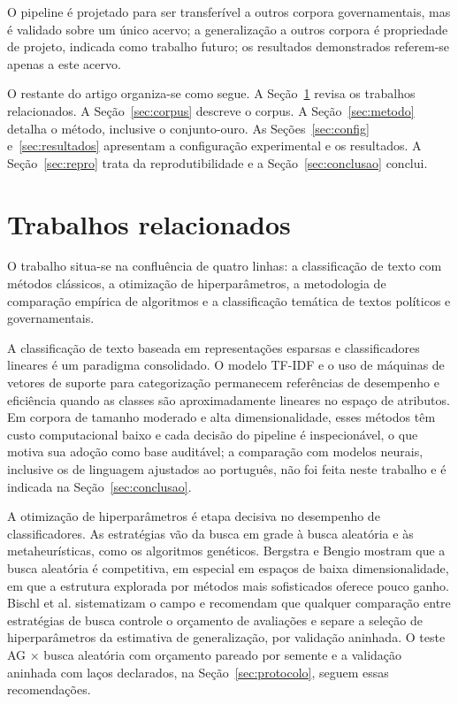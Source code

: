 \documentclass[fleqn,10pt]{SelfArx}
\begin{document}
O pipeline é projetado para ser transferível a outros corpora governamentais, mas é validado sobre um único acervo; a generalização a outros corpora é propriedade de projeto, indicada como trabalho futuro; os resultados demonstrados referem-se apenas a este acervo.

O restante do artigo organiza-se como segue. A Seção~\ref{sec:relacionados} revisa os trabalhos relacionados. A Seção~\ref{sec:corpus} descreve o corpus. A Seção~\ref{sec:metodo} detalha o método, inclusive o conjunto-ouro. As Seções~\ref{sec:config} e~\ref{sec:resultados} apresentam a configuração experimental e os resultados. A Seção~\ref{sec:repro} trata da reprodutibilidade e a Seção~\ref{sec:conclusao} conclui.

\section{Trabalhos relacionados}
\label{sec:relacionados}

O trabalho situa-se na confluência de quatro linhas: a classificação de texto com métodos clássicos, a otimização de hiperparâmetros, a metodologia de comparação empírica de algoritmos e a classificação temática de textos políticos e governamentais.

A classificação de texto baseada em representações esparsas e classificadores lineares é um paradigma consolidado. O modelo TF-IDF \cite{salton1988, manning2008} e o uso de máquinas de vetores de suporte para categorização \cite{joachims1998, cortes1995} permanecem referências de desempenho e eficiência quando as classes são aproximadamente lineares no espaço de atributos. Em corpora de tamanho moderado e alta dimensionalidade, esses métodos têm custo computacional baixo e cada decisão do pipeline é inspecionável, o que motiva sua adoção como base auditável; a comparação com modelos neurais, inclusive os de linguagem ajustados ao português, não foi feita neste trabalho e é indicada na Seção~\ref{sec:conclusao}.

A otimização de hiperparâmetros é etapa decisiva no desempenho de classificadores. As estratégias vão da busca em grade à busca aleatória e às metaheurísticas, como os algoritmos genéticos. Bergstra e Bengio \cite{bergstra2012} mostram que a busca aleatória é competitiva, em especial em espaços de baixa dimensionalidade, em que a estrutura explorada por métodos mais sofisticados oferece pouco ganho. Bischl et al. \cite{bischl2023} sistematizam o campo e recomendam que qualquer comparação entre estratégias de busca controle o orçamento de avaliações e separe a seleção de hiperparâmetros da estimativa de generalização, por validação aninhada. O teste AG $\times$ busca aleatória com orçamento pareado por semente e a validação aninhada com laços declarados, na Seção~\ref{sec:protocolo}, seguem essas recomendações.
\end{document}
